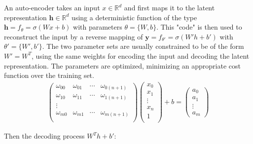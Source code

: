 \documentclass[final, paper=letter,5p,times,twocolumn]{elsarticle}
\begin{document}
An auto-encoder takes an input $x \in \mathbb{R}^{d}$ and first maps it to the latent representation $\bm{h} \in \mathbb{R}^{d}$ using a deterministic function of the type $\bm{h} = f_{\theta} = \sigma(Wx + b)$ with parameters $\theta = \{W, b\}$. This "code" is then used to reconstruct the input by a reverse mapping of $\bm{y} = f_{\theta'} = \sigma( W'h + b')$ with $\theta' = \{W', b'\}$. The two parameter sets are usually constrained to be of the form $W' = W^{T}$, using the same weights for encoding the input and decoding the latent representation. The parameters are optimized, minimizing an appropriate cost function over the training set.\\

\begin{eqnarray*}
  \left(
  \begin{array}{cccc}
    \omega_{00} & \omega_{01} & \cdots & \omega_{0(n+1)} \\
    \omega_{10} & \omega_{11} & \cdots & \omega_{1(n+1)} \\
    \vdots \\
    \omega_{m0} & \omega_{m1} & \cdots & \omega_{m(n+1)} \\
  \end{array}
  \right) \left(
  \begin{array}{c}
    x_{0} \\
    x_{1} \\
    \vdots \\
    x_{n} \\
    1 \\
  \end{array}
  \right) + b = \left(
  \begin{array}{c}
    a_{0} \\
    a_{1} \\
    \vdots \\
    a_{m} 
  \end{array}
  \right)
\end{eqnarray*}

Then the decoding process $W^{T}h + b'$:
\end{document}
